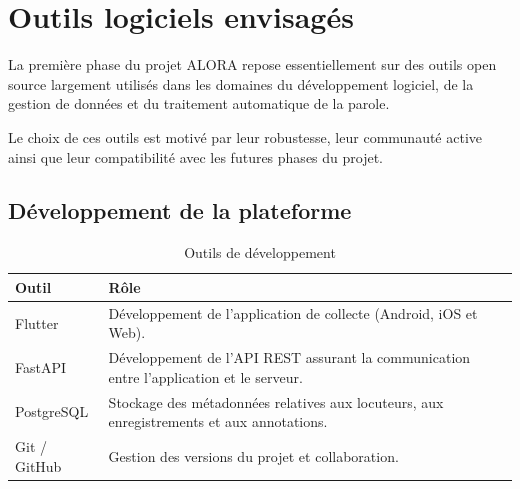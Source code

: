 \section{Outils logiciels envisagés}

La première phase du projet ALORA repose essentiellement sur des outils
open source largement utilisés dans les domaines du développement
logiciel, de la gestion de données et du traitement automatique de la
parole.

Le choix de ces outils est motivé par leur robustesse, leur communauté
active ainsi que leur compatibilité avec les futures phases du projet.


\subsection{Développement de la plateforme}

\begin{table}[H]

\centering

\begin{tabular}{p{4cm}p{9cm}}

\toprule

\textbf{Outil} & \textbf{Rôle} \\

\midrule

Flutter &
Développement de l'application de collecte (Android, iOS et Web). \\

FastAPI &
Développement de l'API REST assurant la communication entre
l'application et le serveur. \\

PostgreSQL &
Stockage des métadonnées relatives aux locuteurs, aux enregistrements et
aux annotations. \\

Git / GitHub &
Gestion des versions du projet et collaboration. \\

\bottomrule

\end{tabular}

\caption{Outils de développement}

\end{table}

